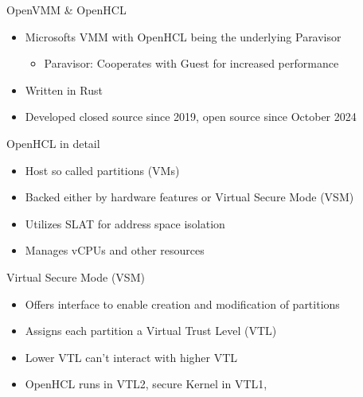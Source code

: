 \documentclass[aspectratio=169]{beamer}
\begin{document}
\begin{frame}{OpenVMM \& OpenHCL}
    \begin{itemize}
        \item Microsofts VMM with OpenHCL being the underlying Paravisor
              \begin{itemize}
                  \item Paravisor: Cooperates with Guest for increased performance
              \end{itemize}
        \item Written in Rust
        \item Developed closed source since 2019, open source since October 2024
    \end{itemize}
\end{frame}
\begin{frame}{OpenHCL in detail}
    \begin{itemize}
        \item Host so called partitions (VMs)
        \item Backed either by hardware features or Virtual Secure Mode (VSM)
        \item Utilizes SLAT for address space isolation
        \item Manages vCPUs and other resources
    \end{itemize}
\end{frame}
\begin{frame}{Virtual Secure Mode (VSM)}
    \begin{itemize}
        \item Offers interface to enable creation and modification of partitions
        \item Assigns each partition a Virtual Trust Level (VTL)
        \item Lower VTL can't interact with higher VTL
        \item OpenHCL runs in VTL2, secure Kernel in VTL1,
    \end{itemize}
\end{frame}
\end{document}
